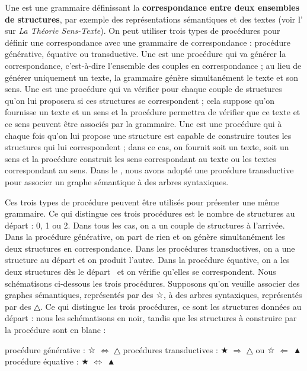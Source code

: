 {    Une  est une grammaire définissant la \textbf{correspondance entre deux ensembles de structures}, par exemple des représentations sémantiques et des textes (voir l’ sur \textit{La Théorie Sens-Texte}). On peut utiliser trois types de procédures pour définir une correspondance avec une grammaire de correspondance : procédure générative, équative ou transductive. Une  est une procédure qui va générer la correspondance, c’est-à-dire l’ensemble des couples en correspondance ; au lieu de générer uniquement un texte, la grammaire génère simultanément le texte et son sens. Une  est une procédure qui va vérifier pour chaque couple de structures qu’on lui proposera si ces structures se correspondent ; cela suppose qu’on fournisse un texte et un sens et la procédure permettra de vérifier que ce texte et ce sens peuvent être associés par la grammaire. Une  est une procédure qui à chaque fois qu’on lui propose une structure est capable de construire toutes les structures qui lui correspondent ; dans ce cas, on fournit soit un texte, soit un sens et la procédure construit les sens correspondant au texte ou les textes correspondant au sens. Dans le , nous avons adopté une procédure transductive pour associer un graphe sémantique à des arbres syntaxiques.

    Ces trois types de procédure peuvent être utilisés pour présenter une même grammaire. Ce qui distingue ces trois procédures est le nombre de structures au départ : 0, 1 ou 2. Dans tous les cas, on a un couple de structures à l’arrivée. Dans la procédure générative, on part de rien et on génère simultanément les deux structures en correspondance. Dans les procédures transductives, on a une structure au départ et on produit l’autre. Dans la procédure équative, on a les deux structures dès le départ~ et on vérifie qu’elles se correspondent. Nous schématisons ci-dessous les trois procédures. Supposons qu’on veuille associer des graphes sémantiques, représentés par des {\xitsfont ☆}, à des arbres syntaxiques, représentés par des {\xitsfont\scriptsize △}. Ce qui distingue les trois procédures, ce sont les structures données au départ : nous les schématisons en noir, tandis que les structures à construire par la procédure sont en blanc :
    
    \ea procédure générative :        {\xitsfont ☆} ${\Leftrightarrow}$ {\xitsfont\scriptsize △}
    \ex procédures transductives :    {\xitsfont ★} ${\Rightarrow}$ {\xitsfont\scriptsize △}
                                       ou {\xitsfont ☆} ${\Leftarrow}$ {\xitsfont\scriptsize ▲}
    \ex procédure équative :          {\xitsfont ★} ${\Leftrightarrow}$ {\xitsfont\scriptsize ▲}
    \z
    
}
